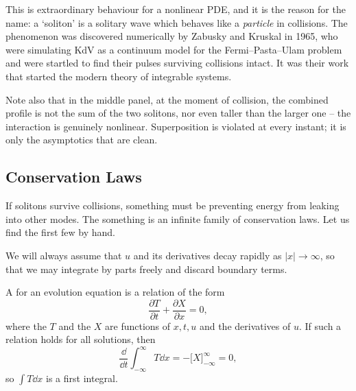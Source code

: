 This is extraordinary behaviour for a nonlinear PDE, and it is the reason for the name: a `soliton' is a solitary wave which behaves like a \emph{particle} in collisions. The phenomenon was discovered numerically by Zabusky and Kruskal in 1965, who were simulating KdV as a continuum model for the Fermi--Pasta--Ulam problem and were startled to find their pulses surviving collisions intact. It was their work that started the modern theory of integrable systems.

Note also that in the middle panel, at the moment of collision, the combined profile is not the sum of the two solitons, nor even taller than the larger one -- the interaction is genuinely nonlinear. Superposition is violated at every instant; it is only the asymptotics that are clean.

\subsection{Conservation Laws}

If solitons survive collisions, something must be preventing energy from leaking into other modes. The something is an infinite family of conservation laws. Let us find the first few by hand.

We will always assume that $u$ and its derivatives decay rapidly as $|x|\to\infty$, so that we may integrate by parts freely and discard boundary terms.

\begin{definition}
	A  for an evolution equation is a relation of the form
	$$
	\frac{\partial T}{\partial t} + \frac{\partial X}{\partial x} = 0,
	$$
	where the  $T$ and the  $X$ are functions of $x, t, u$ and the derivatives of $u$. If such a relation holds for all solutions, then
	$$
	\frac{\dd}{\dd t}\int_{-\infty}^\infty T\dd x = -\Big[X\Big]_{-\infty}^\infty = 0,
	$$
	so $\int T \dd x$ is a first integral.
\end{definition}

